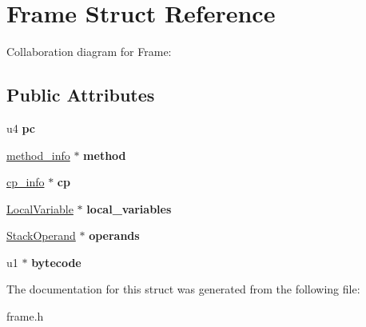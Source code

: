 \hypertarget{structFrame}{}\section{Frame Struct Reference}
\label{structFrame}


Collaboration diagram for Frame\+:
\subsection*{Public Attributes}
\begin{DoxyCompactItemize}
\item 
u4 {\bfseries pc}\hypertarget{structFrame_ada6a6cf76d00cbadf43a86a686dd026c}{}\label{structFrame_ada6a6cf76d00cbadf43a86a686dd026c}

\item 
\hyperlink{structmethod__info}{method\+\_\+info} $\ast$ {\bfseries method}\hypertarget{structFrame_af0943cac72b53aa5aa67f3e7097430a1}{}\label{structFrame_af0943cac72b53aa5aa67f3e7097430a1}

\item 
\hyperlink{structcp__info}{cp\+\_\+info} $\ast$ {\bfseries cp}\hypertarget{structFrame_ada1bd832b6f72f87a35d88c68b9a188a}{}\label{structFrame_ada1bd832b6f72f87a35d88c68b9a188a}

\item 
\hyperlink{structLocalVariable}{Local\+Variable} $\ast$ {\bfseries local\+\_\+variables}\hypertarget{structFrame_a1a3968ae645e9c154229a2631639ebd5}{}\label{structFrame_a1a3968ae645e9c154229a2631639ebd5}

\item 
\hyperlink{structStackOperand}{Stack\+Operand} $\ast$ {\bfseries operands}\hypertarget{structFrame_ab311fc7762ab460f039e58b024c4d229}{}\label{structFrame_ab311fc7762ab460f039e58b024c4d229}

\item 
u1 $\ast$ {\bfseries bytecode}\hypertarget{structFrame_ad3bdd8cc30352e62af5898b699d54c16}{}\label{structFrame_ad3bdd8cc30352e62af5898b699d54c16}

\end{DoxyCompactItemize}


The documentation for this struct was generated from the following file\+:\begin{DoxyCompactItemize}
\item 
frame.\+h\end{DoxyCompactItemize}
